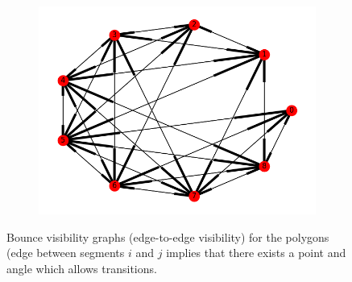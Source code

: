 \documentclass[]{article}  %
\begin{document}
\begin{figure}
\begin{subfigure}{0.33\textwidth}
  \includegraphics[width=\linewidth]{figures/graph2.png}
\end{subfigure}
\caption{Bounce visibility graphs (edge-to-edge visibility) for the polygons (edge between segments $i$
and $j$ implies that there exists a point and angle which allows transitions.}
\end{figure}
\end{document}
